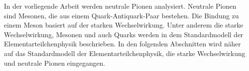 In der vorliegende Arbeit werden neutrale Pionen analysiert.
Neutrale Pionen sind Mesonen, die aus einem Quark-Antiquark-Paar bestehen.
Die Bindung zu einem Meson basiert auf der starken Wechselwirkung.
Unter anderem die starke Wechselwirkung, Mesonen und auch Quarks werden in dem Standardmodell der Elementarteilchenphysik beschrieben.
In den folgenden Abschnitten wird n\"aher auf das Standardmodell der Elementarteilchenphysik, die starke Wechselwirkung und neutrale Pionen eingegangen.
